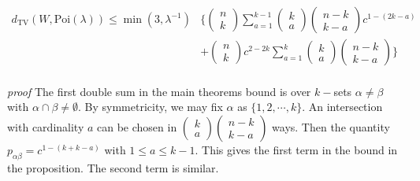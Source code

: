 \documentclass[12pt]{article}
\begin{document}
\begin{align}
	d_{\text{TV}}(W, \text{Poi}(\lambda)) \leqslant \min(3, \lambda^{-1})&\big\{\left(\begin{array}{c}
n\\
k\end{array}\right)\sum_{a = 1}^{k - 1}\left(\begin{array}{c}
k\\
a\end{array}\right)\left(\begin{array}{c}
n - k\\
k - a\end{array}\right)c^{1 - (2k - a)}\nonumber\\
&+ \left(\begin{array}{c}
n\\
k\end{array}\right)c^{2 - 2k}\sum_{a = 1}^k\left(\begin{array}{c}
k\\
a\end{array}\right)\left(\begin{array}{c}
n - k\\
k - a\end{array}\right)\big\}\nonumber
\end{align}
\\
\emph{proof} The first double sum in the main theorems bound is over $k-$sets $\alpha \neq \beta$ with $\alpha \cap \beta \neq \emptyset$. By symmetricity, we may fix $\alpha$ as $\{1, 2, \cdots, k\}$. An intersection with cardinality $a$ can be chosen in $\left(\begin{array}{c}
k\\
a\end{array}\right)\left(\begin{array}{c}
n - k\\
k - a\end{array}\right)$ ways. Then the quantity $p_{\alpha \beta} = c^{1 - (k + k - a)}$ with $1 \leqslant a \leqslant k - 1$. This gives the first term in the bound in the proposition. The second term is similar.\\
\\
\end{document}
